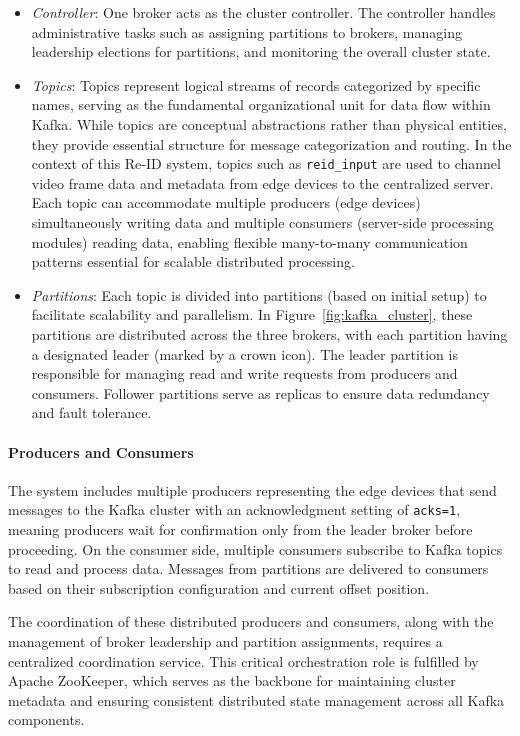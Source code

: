 \begin{itemize}
    \item \textit{Controller}: One broker acts as the cluster controller. The controller handles administrative tasks such as assigning partitions to brokers, managing leadership elections for partitions, and monitoring the overall cluster state.
    
    \item \textit{Topics}: Topics represent logical streams of records categorized by specific names, serving as the fundamental organizational unit for data flow within Kafka. While topics are conceptual abstractions rather than physical entities, they provide essential structure for message categorization and routing. In the context of this Re-ID system, topics such as \texttt{reid\_input} are used to channel video frame data and metadata from edge devices to the centralized server. Each topic can accommodate multiple producers (edge devices) simultaneously writing data and multiple consumers (server-side processing modules) reading data, enabling flexible many-to-many communication patterns essential for scalable distributed processing.
    
    \item \textit{Partitions}: Each topic is divided into partitions (based on initial setup) to facilitate scalability and parallelism. In Figure~\ref{fig:kafka_cluster}, these partitions are distributed across the three brokers, with each partition having a designated leader (marked by a crown icon). The leader partition is responsible for managing read and write requests from producers and consumers. Follower partitions serve as replicas to ensure data redundancy and fault tolerance.
\end{itemize}

\paragraph{Producers and Consumers}

The system includes multiple producers representing the edge devices that send messages to the Kafka cluster with an acknowledgment setting of \texttt{acks=1}, meaning producers wait for confirmation only from the leader broker before proceeding. On the consumer side, multiple consumers subscribe to Kafka topics to read and process data. Messages from partitions are delivered to consumers based on their subscription configuration and current offset position.

The coordination of these distributed producers and consumers, along with the management of broker leadership and partition assignments, requires a centralized coordination service. This critical orchestration role is fulfilled by Apache ZooKeeper, which serves as the backbone for maintaining cluster metadata and ensuring consistent distributed state management across all Kafka components.

